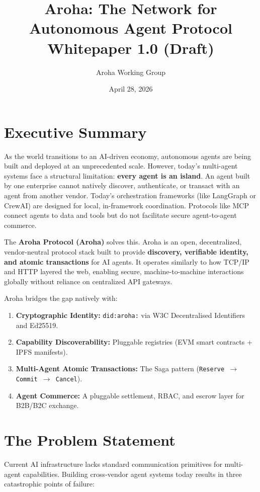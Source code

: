 \documentclass[11pt,a4paper]{article}
\title{\textbf{Aroha: The Network for Autonomous Agent Protocol}\\ \Large{Whitepaper 1.0 (Draft)}}
\author{Aroha Working Group}
\date{April 28, 2026}
\begin{document}
\maketitle
\tableofcontents
\newpage

\section{Executive Summary}
As the world transitions to an AI-driven economy, autonomous agents are being built and deployed at an unprecedented scale. However, today's multi-agent systems face a structural limitation: \textbf{every agent is an island}. An agent built by one enterprise cannot natively discover, authenticate, or transact with an agent from another vendor. Today's orchestration frameworks (like LangGraph or CrewAI) are designed for local, in-framework coordination. Protocols like MCP connect agents to data and tools but do not facilitate secure agent-to-agent commerce.

The \textbf{Aroha Protocol (Aroha)} solves this. Aroha is an open, decentralized, vendor-neutral protocol stack built to provide \textbf{discovery, verifiable identity, and atomic transactions} for AI agents. It operates similarly to how TCP/IP and HTTP layered the web, enabling secure, machine-to-machine interactions globally without reliance on centralized API gateways.

Aroha bridges the gap natively with:
\begin{enumerate}[label=\textbf{\arabic*.}]
    \item \textbf{Cryptographic Identity:} \texttt{did:aroha:} via W3C Decentralised Identifiers and Ed25519.
    \item \textbf{Capability Discoverability:} Pluggable registries (EVM smart contracts + IPFS manifests).
    \item \textbf{Multi-Agent Atomic Transactions:} The Saga pattern (\texttt{Reserve $\rightarrow$ Commit $\rightarrow$ Cancel}).
    \item \textbf{Agent Commerce:} A pluggable settlement, RBAC, and escrow layer for B2B/B2C exchange.
\end{enumerate}

\section{The Problem Statement}
Current AI infrastructure lacks standard communication primitives for multi-agent capabilities. Building cross-vendor agent systems today results in three catastrophic points of failure:
\end{document}
